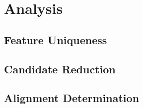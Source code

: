 \section{Analysis}

\subsection{Feature Uniqueness}

\subsection{Candidate Reduction}

\subsection{Alignment Determination}